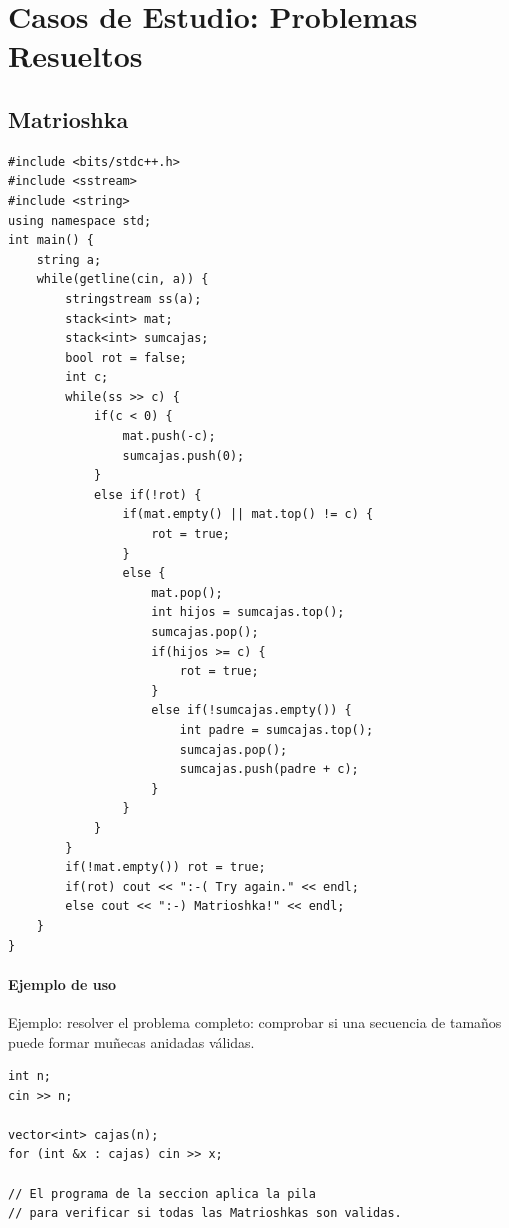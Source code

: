 \documentclass[10pt,twocolumn,letterpaper]{report}
\begin{document}
\chapter{Casos de Estudio: Problemas Resueltos}
\section{Matrioshka}
\begin{lstlisting}
#include <bits/stdc++.h>
#include <sstream>
#include <string>
using namespace std;
int main() {
    string a;
    while(getline(cin, a)) {
        stringstream ss(a);
        stack<int> mat;
        stack<int> sumcajas;
        bool rot = false;
        int c;
        while(ss >> c) {
            if(c < 0) {
                mat.push(-c);
                sumcajas.push(0);
            }
            else if(!rot) {
                if(mat.empty() || mat.top() != c) {
                    rot = true;
                }
                else {
                    mat.pop();
                    int hijos = sumcajas.top();
                    sumcajas.pop();
                    if(hijos >= c) {
                        rot = true;
                    }
                    else if(!sumcajas.empty()) {
                        int padre = sumcajas.top();
                        sumcajas.pop();
                        sumcajas.push(padre + c);
                    }
                }
            }
        }
        if(!mat.empty()) rot = true;
        if(rot) cout << ":-( Try again." << endl;
        else cout << ":-) Matrioshka!" << endl;
    }
}
\end{lstlisting}
\subsubsection*{Ejemplo de uso}
Ejemplo: resolver el problema completo: comprobar si una secuencia de tamaños puede formar muñecas anidadas válidas.
\begin{lstlisting}
int n;
cin >> n;

vector<int> cajas(n);
for (int &x : cajas) cin >> x;

// El programa de la seccion aplica la pila
// para verificar si todas las Matrioshkas son validas.
\end{lstlisting}


\end{document}
